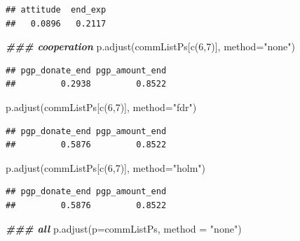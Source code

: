 \documentclass[
]{article}
\newenvironment{Shaded}{\begin{snugshade}}{\end{snugshade}}
\newcommand{\AttributeTok}[1]{\textcolor[rgb]{0.77,0.63,0.00}{#1}}
\newcommand{\DecValTok}[1]{\textcolor[rgb]{0.00,0.00,0.81}{#1}}
\newcommand{\DocumentationTok}[1]{\textcolor[rgb]{0.56,0.35,0.01}{\textbf{\textit{#1}}}}
\newcommand{\FunctionTok}[1]{\textcolor[rgb]{0.00,0.00,0.00}{#1}}
\newcommand{\NormalTok}[1]{#1}
\newcommand{\StringTok}[1]{\textcolor[rgb]{0.31,0.60,0.02}{#1}}
\begin{document}
\begin{verbatim}
## attitude  end_exp 
##   0.0896   0.2117
\end{verbatim}

\begin{Shaded}
\begin{Highlighting}[]
\DocumentationTok{\#\#\# cooperation}
\FunctionTok{p.adjust}\NormalTok{(commListPs[}\FunctionTok{c}\NormalTok{(}\DecValTok{6}\NormalTok{,}\DecValTok{7}\NormalTok{)], }\AttributeTok{method=}\StringTok{"none"}\NormalTok{)}
\end{Highlighting}
\end{Shaded}

\begin{verbatim}
## pgp_donate_end pgp_amount_end 
##         0.2938         0.8522
\end{verbatim}

\begin{Shaded}
\begin{Highlighting}[]
\FunctionTok{p.adjust}\NormalTok{(commListPs[}\FunctionTok{c}\NormalTok{(}\DecValTok{6}\NormalTok{,}\DecValTok{7}\NormalTok{)], }\AttributeTok{method=}\StringTok{"fdr"}\NormalTok{)}
\end{Highlighting}
\end{Shaded}

\begin{verbatim}
## pgp_donate_end pgp_amount_end 
##         0.5876         0.8522
\end{verbatim}

\begin{Shaded}
\begin{Highlighting}[]
\FunctionTok{p.adjust}\NormalTok{(commListPs[}\FunctionTok{c}\NormalTok{(}\DecValTok{6}\NormalTok{,}\DecValTok{7}\NormalTok{)], }\AttributeTok{method=}\StringTok{"holm"}\NormalTok{)}
\end{Highlighting}
\end{Shaded}

\begin{verbatim}
## pgp_donate_end pgp_amount_end 
##         0.5876         0.8522
\end{verbatim}

\begin{Shaded}
\begin{Highlighting}[]
\DocumentationTok{\#\#\# all}
\FunctionTok{p.adjust}\NormalTok{(}\AttributeTok{p=}\NormalTok{commListPs, }\AttributeTok{method =} \StringTok{"none"}\NormalTok{)}
\end{Highlighting}
\end{Shaded}
\end{document}
